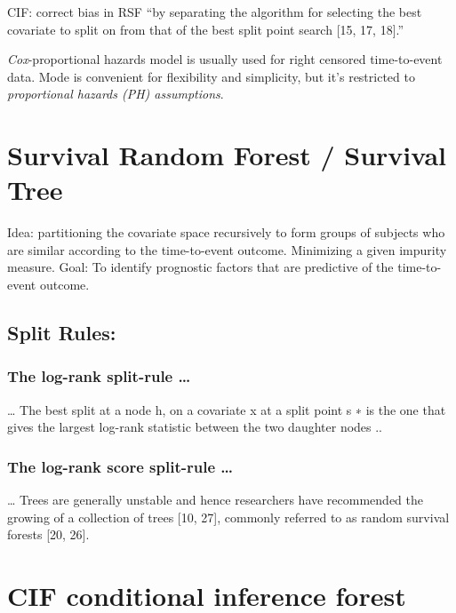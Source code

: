 \documentclass[
]{article}
\begin{document}
CIF: correct bias in RSF ``by separating the algorithm for selecting the
best covariate to split on from that of the best split point search
{[}15, 17, 18{]}.''

\emph{Cox}-proportional hazards model is usually used for right censored
time-to-event data. Mode is convenient for flexibility and simplicity,
but it's restricted to \emph{proportional hazards (PH) assumptions}.

\hypertarget{survival-random-forest-survival-tree}{%
\section{Survival Random Forest / Survival
Tree}\label{survival-random-forest-survival-tree}}

Idea: partitioning the covariate space recursively to form groups of
subjects who are similar according to the time-to-event outcome.
Minimizing a given impurity measure. Goal: To identify prognostic
factors that are predictive of the time-to-event outcome.

\hypertarget{split-rules}{%
\subsection{Split Rules:}\label{split-rules}}

\hypertarget{the-log-rank-split-rule}{%
\subsubsection{The log-rank split-rule
\ldots{}}\label{the-log-rank-split-rule}}

\ldots{} The best split at a node h, on a covariate x at a split point s
∗ is the one that gives the largest log-rank statistic between the two
daughter nodes ..

\hypertarget{the-log-rank-score-split-rule}{%
\subsubsection{The log-rank score split-rule
\ldots{}}\label{the-log-rank-score-split-rule}}

\ldots{} Trees are generally unstable and hence researchers have
recommended the growing of a collection of trees {[}10, 27{]}, commonly
referred to as random survival forests {[}20, 26{]}.

\hypertarget{cif-conditional-inference-forest}{%
\section{CIF conditional inference
forest}\label{cif-conditional-inference-forest}}
\end{document}
